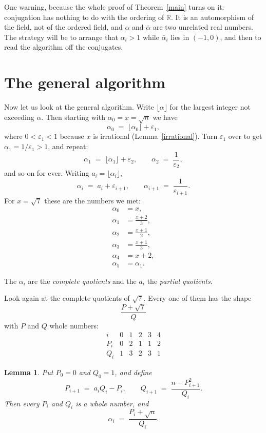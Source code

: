 \documentclass[12pt,a4paper]{article}
\theoremstyle{plain}
\newtheorem{lemma}[theorem]{Lemma}
\theoremstyle{definition}
\begin{document}
One warning, because the whole proof of Theorem~\ref{main} turns on it:
conjugation has nothing to do with the ordering of $\mathbb{R}$. It is an
automorphism of the field, not of the ordered field, and $\alpha$ and
$\bar\alpha$ are two unrelated real numbers. The strategy will be to arrange
that $\alpha_i > 1$ while $\bar\alpha_i$ lies in $(-1,0)$, and then to read the
algorithm off the conjugates.

\section{The general algorithm}

Now let us look at the general algorithm. Write $\lfloor\alpha\rfloor$ for the
largest integer not exceeding $\alpha$. Then starting with
$\alpha_0 = x = \sqrt n$ we have
\[
  \alpha_0 \;=\; \lfloor\alpha_0\rfloor + \varepsilon_1 ,
\]
where $0 < \varepsilon_1 < 1$ because $x$ is irrational
(Lemma~\ref{irrational}). Turn $\varepsilon_1$
over to get $\alpha_1 = 1/\varepsilon_1 > 1$, and repeat:
\[
  \alpha_1 \;=\; \lfloor\alpha_1\rfloor + \varepsilon_2 ,
  \qquad
  \alpha_2 \;=\; \frac{1}{\varepsilon_2} ,
\]
and so on for ever. Writing $a_i = \lfloor\alpha_i\rfloor$,
\[
  \alpha_i \;=\; a_i + \varepsilon_{i+1} ,
  \qquad
  \alpha_{i+1} \;=\; \frac{1}{\varepsilon_{i+1}} .
\]
For $x = \sqrt 7$ these are the numbers we met:
\begin{align*}
  \alpha_0 &= x,\\
  \alpha_1 &= \frac{x+2}{3},\\
  \alpha_2 &= \frac{x+1}{2},\\
  \alpha_3 &= \frac{x+1}{3},\\
  \alpha_4 &= x+2,\\
  \alpha_5 &= \alpha_1 .
\end{align*}

The $\alpha_i$ are the \emph{complete quotients} and the
$a_i$ the \emph{partial quotients}.

Look again at the complete quotients of $\sqrt 7$. Every one of them has the
shape
\[
  \frac{P + \sqrt 7}{Q}
\]
with $P$ and $Q$ whole numbers:
\[
  \begin{array}{c|ccccc}
    i   & 0 & 1 & 2 & 3 & 4 \\ \hline
    P_i & 0 & 2 & 1 & 1 & 2 \\
    Q_i & 1 & 3 & 2 & 3 & 1
  \end{array}
\]
\begin{lemma}\label{pq}
Put $P_0 = 0$ and $Q_0 = 1$, and define
\[
  P_{i+1} \;=\; a_i Q_i - P_i ,
  \qquad
  Q_{i+1} \;=\; \frac{n - P_{i+1}^2}{Q_i} .
\]
Then every $P_i$ and $Q_i$ is a whole number, and
\[
  \alpha_i \;=\; \frac{P_i + \sqrt n}{Q_i} .
\]
\end{lemma}
\end{document}
